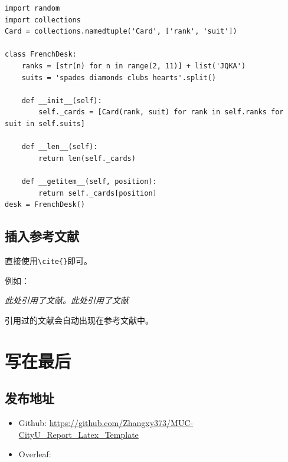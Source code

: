 \documentclass[12pt,hyperref,a4paper,UTF8]{ctexart}
\begin{document}
\begin{lstlisting}[style=Python, title="Python代码"]                
import random
import collections
Card = collections.namedtuple('Card', ['rank', 'suit'])

class FrenchDesk:
    ranks = [str(n) for n in range(2, 11)] + list('JQKA')
    suits = 'spades diamonds clubs hearts'.split()
    
    def __init__(self):
        self._cards = [Card(rank, suit) for rank in self.ranks for suit in self.suits]
        
    def __len__(self):
        return len(self._cards)
        
    def __getitem__(self, position):
        return self._cards[position]
desk = FrenchDesk()
\end{lstlisting}

\subsection{插入参考文献}
直接使用\verb|\cite{}|即可。

例如：

   \textit{ 此处引用了文献\cite{0Isaac}。此处引用了文献\cite{2016The}}

引用过的文献会自动出现在参考文献中。

\section{写在最后}
\subsection{发布地址}
\begin{itemize}
    \item Github: \url{https://github.com/Zhangxy373/MUC-CityU_Report_Latex_Template}
    \item Overleaf:  \url{}
\end{itemize}


\end{document}
